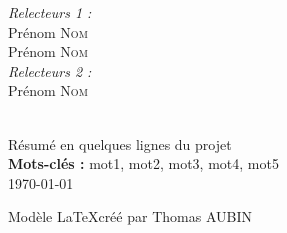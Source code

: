 \begin{titlepage}
\begin{center}
\begin{minipage}{0.4\textwidth}
\begin{flushleft}
            \end{flushleft}
        \end{minipage}
        \begin{minipage}{0.4\textwidth}
            \begin{flushright} \large
                \emph{Relecteurs 1 :} \\
                Prénom \textsc{Nom}\\
                Prénom \textsc{Nom}\\
                \emph{Relecteurs 2 :} \\
                Prénom \textsc{Nom}
            \end{flushright}
        \end{minipage}
        \vfill
        \\[3mm]
        Résumé en quelques lignes du projet\\
        \textbf{Mots-clés :} mot1, mot2, mot3, mot4, mot5\\
        \vfill
        {\large \today}
        \begin{flushright}
            \small{Modèle \LaTeX créé par Thomas AUBIN}
        \end{flushright}
    \end{center}
\end{titlepage}